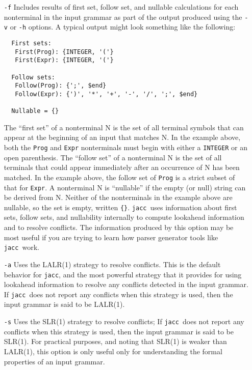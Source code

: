 \documentclass[12pt]{article}
\def\jacc{{\tt jacc}}
\begin{document}
\begin{itemize}
\item[{\tt -f}]
     Includes results of first set, follow set, and nullable
     calculations for each nonterminal in the input grammar
     as part of the output produced using the \verb"-v" or
     \verb"-h" options.  A typical output might look something
     like the following:
\begin{verbatim}
  First sets:
   First(Prog): {INTEGER, '('}
   First(Expr): {INTEGER, '('}

  Follow sets:
   Follow(Prog): {';', $end}
   Follow(Expr): {')', '*', '+', '-', '/', ';', $end}

  Nullable = {}
\end{verbatim} 
     The ``first set'' of a nonterminal N
     is the set of all terminal symbols that can appear at the
     beginning of an input that matches N.  In the example above,
     both the \verb"Prog" and \verb"Expr" nonterminals must begin
     with either a \verb"INTEGER" or an open parenthesis.
     The ``follow set'' of a nonterminal N is the set of all
     terminals that could appear immediately after an occurrence
     of N has been matched.  In the example above, the follow
     set of \verb"Prog" is a strict subset of that for \verb"Expr".
     A nonterminal N is ``nullable'' if the empty (or null) string
     can be derived from N.  Neither of the nonterminals in the
     example above are nullable, so the set is empty, written \verb"{}".
     \jacc\ uses
     information about first sets, follow sets, and nullability
     internally to compute lookahead information and to resolve
     conflicts.  The information produced by this option may
     be most useful if you are trying to learn how parser
     generator tools like \jacc\ work.

\item[{\tt -a}]
     Uses the LALR(1) strategy to resolve conflicts.  This is
     the default behavior for \jacc, and the most powerful
     strategy that it provides for using lookahead information
     to resolve any conflicts detected in the input grammar.
     If \jacc\ does not report any conflicts when this strategy
     is used, then the input grammar is said to be LALR(1).

\item[{\tt -s}]
     Uses the SLR(1) strategy to resolve conflicts; If \jacc\ does
     not report any conflicts when this strategy is used, then the
     input grammar is said to be SLR(1).  For practical purposes,
     and noting that SLR(1) is weaker than LALR(1), this option
     is only useful only for understanding the formal properties
     of an input grammar.


\end{itemize}
\end{document}
